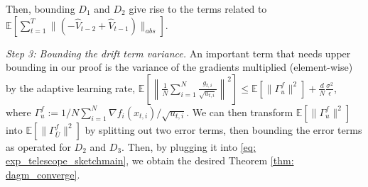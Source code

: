 \documentclass[anon,12pt]{colt2021} %
\begin{document}
  Then, bounding $D_1$ and $D_2$ give rise to the terms related to $    \mathbb E \left [    \sum_{t=1}^T  \| ( - \hat V_{t-2} + \hat V_{t-1}) \|_{abs}   \right]$.


\noindent  \textsl{Step 3: Bounding the drift term variance.}\hspace{0.01in} An important term that needs upper bounding in our proof is the variance of the gradients multiplied (element-wise) by the adaptive learning rate, $ \mathbb E\left[ \left\| \frac{1}{N} \sum_{i=1}^N \frac{g_{t,i}}{\sqrt{u_{t,i}}} \right\|^2 \right]  \leq   \mathbb E [\| \Gamma_{u}^f\|^2 ] + \frac{d}{N}   \frac{ \sigma^2 }{\epsilon}$,
 where $ \Gamma_{u}^f := 1/N \sum_{i=1}^N \nabla f_i(x_{t,i})/\sqrt{u_{t,i}} $. We can then transform $\mathbb E [\| \Gamma_{u}^f\|^2 ]$ into $\mathbb E [\|\Gamma_{\overline{U}}^f \|^2]$ by splitting out two error terms, then bounding the error terms as operated for $D_2$ and $D_3$. 
 Then, by plugging it into \eqref{eq: exp_telescope_sketchmain}, we obtain the desired Theorem \ref{thm: dagm_converge}.
\end{document}
